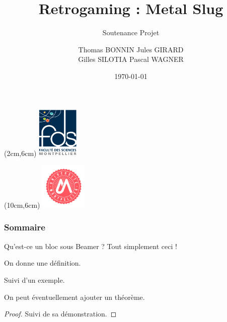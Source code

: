 \documentclass{beamer}
\title[Présentation]{Retrogaming : Metal Slug}
\subtitle[\ldots]{Soutenance Projet}
\author[BONNIN GIRARD SILOTIA WAGNER]{Thomas BONNIN Jules GIRARD \\ Gilles SILOTIA Pascal WAGNER}
\institute[UM2]{Université de Montpellier}
\institute[UM2]{Université de Montpellier \\ Faculté des Sciences}
\date{\today}
\begin{document}
		
		\begingroup
			\makeatletter
				\setlength{\hoffset}{-.5\beamer@sidebarwidth}
			\makeatother
			\begin{frame}[plain]
				\begin{textblock*}{2cm}(2cm,6cm) %
					\includegraphics[width=2cm]{figures/logo_fds.png}
				\end{textblock*}
				\begin{textblock*}{2.25cm}(10cm,6cm) %
					\includegraphics[width=2.25cm]{figures/logo_um.png}
				\end{textblock*}
				\titlepage
			\end{frame}
		\endgroup
		
		\begin{frame}
			\frametitle{Sommaire}
			\tableofcontents[hideallsubsections]
		\end{frame}
		
		
		
		
		\begin{frame}
			\begin{block}{Qu'est-ce un bloc sous Beamer ?}
				Tout simplement ceci !
			\end{block}
			\begin{definition} %
				On donne une définition.
			\end{definition}

			\begin{example} %
				Suivi d'un exemple.
			\end{example}

			\begin{theorem} %
				On peut éventuellement ajouter un théorème.
			\end{theorem}

			\begin{proof} %
				Suivi de sa démonstration.
			\end{proof}
		\end{frame}
		
\end{document}
